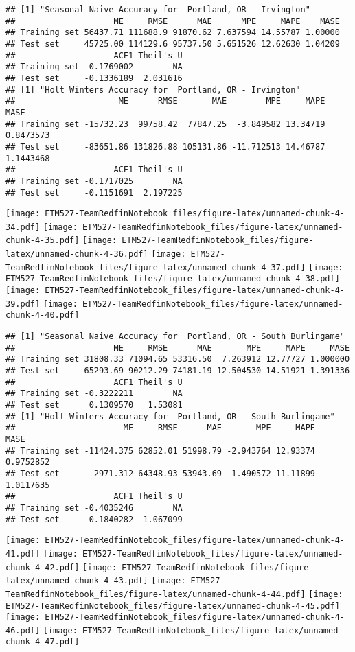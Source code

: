 \documentclass[]{article}
\begin{document}
\begin{verbatim}
## [1] "Seasonal Naive Accuracy for  Portland, OR - Irvington"
##                    ME     RMSE      MAE      MPE     MAPE    MASE
## Training set 56437.71 111688.9 91870.62 7.637594 14.55787 1.00000
## Test set     45725.00 114129.6 95737.50 5.651526 12.62630 1.04209
##                    ACF1 Theil's U
## Training set -0.1769002        NA
## Test set     -0.1336189  2.031616
## [1] "Holt Winters Accuracy for  Portland, OR - Irvington"
##                     ME      RMSE       MAE        MPE     MAPE      MASE
## Training set -15732.23  99758.42  77847.25  -3.849582 13.34719 0.8473573
## Test set     -83651.86 131826.88 105131.86 -11.712513 14.46787 1.1443468
##                    ACF1 Theil's U
## Training set -0.1717025        NA
## Test set     -0.1151691  2.197225
\end{verbatim}

\texttt{[image: ETM527-TeamRedfinNotebook\_files/figure-latex/unnamed-chunk-4-34.pdf]}
\texttt{[image: ETM527-TeamRedfinNotebook\_files/figure-latex/unnamed-chunk-4-35.pdf]}
\texttt{[image: ETM527-TeamRedfinNotebook\_files/figure-latex/unnamed-chunk-4-36.pdf]}
\texttt{[image: ETM527-TeamRedfinNotebook\_files/figure-latex/unnamed-chunk-4-37.pdf]}
\texttt{[image: ETM527-TeamRedfinNotebook\_files/figure-latex/unnamed-chunk-4-38.pdf]}
\texttt{[image: ETM527-TeamRedfinNotebook\_files/figure-latex/unnamed-chunk-4-39.pdf]}
\texttt{[image: ETM527-TeamRedfinNotebook\_files/figure-latex/unnamed-chunk-4-40.pdf]}

\begin{verbatim}
## [1] "Seasonal Naive Accuracy for  Portland, OR - South Burlingame"
##                    ME     RMSE      MAE       MPE     MAPE     MASE
## Training set 31808.33 71094.65 53316.50  7.263912 12.77727 1.000000
## Test set     65293.69 90212.29 74181.19 12.504530 14.51921 1.391336
##                    ACF1 Theil's U
## Training set -0.3222211        NA
## Test set      0.1309570   1.53081
## [1] "Holt Winters Accuracy for  Portland, OR - South Burlingame"
##                      ME     RMSE      MAE       MPE     MAPE      MASE
## Training set -11424.375 62852.01 51998.79 -2.943764 12.93374 0.9752852
## Test set      -2971.312 64348.93 53943.69 -1.490572 11.11899 1.0117635
##                    ACF1 Theil's U
## Training set -0.4035246        NA
## Test set      0.1840282  1.067099
\end{verbatim}

\texttt{[image: ETM527-TeamRedfinNotebook\_files/figure-latex/unnamed-chunk-4-41.pdf]}
\texttt{[image: ETM527-TeamRedfinNotebook\_files/figure-latex/unnamed-chunk-4-42.pdf]}
\texttt{[image: ETM527-TeamRedfinNotebook\_files/figure-latex/unnamed-chunk-4-43.pdf]}
\texttt{[image: ETM527-TeamRedfinNotebook\_files/figure-latex/unnamed-chunk-4-44.pdf]}
\texttt{[image: ETM527-TeamRedfinNotebook\_files/figure-latex/unnamed-chunk-4-45.pdf]}
\texttt{[image: ETM527-TeamRedfinNotebook\_files/figure-latex/unnamed-chunk-4-46.pdf]}
\texttt{[image: ETM527-TeamRedfinNotebook\_files/figure-latex/unnamed-chunk-4-47.pdf]}
\end{document}
